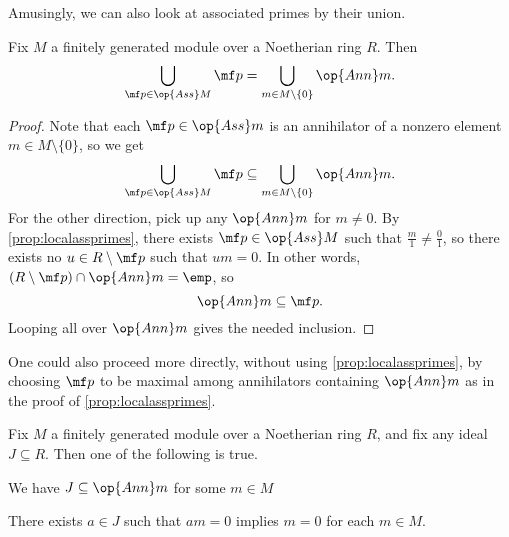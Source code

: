 Amusingly, we can also look at associated primes by their union.
\begin{proposition} \label{prop:unionass}
	Fix $M$ a finitely generated module over a Noetherian ring $R$. Then
	\[\bigcup_{\mf p\in\op{Ass}M}\mf p=\bigcup_{m\in M\setminus\{0\}}\op{Ann}m.\]
\end{proposition}
\begin{proof}
	Note that each $\mf p\in\op{Ass}m$ is an annihilator of a nonzero element $m\in M\setminus\{0\}$, so we get
	\[\bigcup_{\mf p\in\op{Ass}M}\mf p\subseteq\bigcup_{m\in M\setminus\{0\}}\op{Ann}m.\]
	For the other direction, pick up any $\op{Ann}m$ for $m\ne0$. By \autoref{prop:localassprimes}, there exists $\mf p\in\op{Ass}M$ such that $\frac m1\ne\frac01$, so there exists no $u\in R\setminus\mf p$ such that $um=0$. In other words, $(R\setminus\mf p)\cap\op{Ann}m=\emp$, so
	\[\op{Ann}m\subseteq\mf p.\]
	Looping all over $\op{Ann}m$ gives the needed inclusion.
\end{proof}
\begin{remark}[Serganova]
	One could also proceed more directly, without using \autoref{prop:localassprimes}, by choosing $\mf p$ to be maximal among annihilators containing $\op{Ann}m$ as in the proof of \autoref{prop:localassprimes}.
\end{remark}
\begin{corollary}
	Fix $M$ a finitely generated module over a Noetherian ring $R$, and fix any ideal $J\subseteq R$. Then one of the following is true.
	\begin{listroman}
		\item We have $J\subseteq\op{Ann}m$ for some $m\in M$
		\item There exists $a\in J$ such that $am=0$ implies $m=0$ for each $m\in M$.
	\end{listroman}
\end{corollary}
